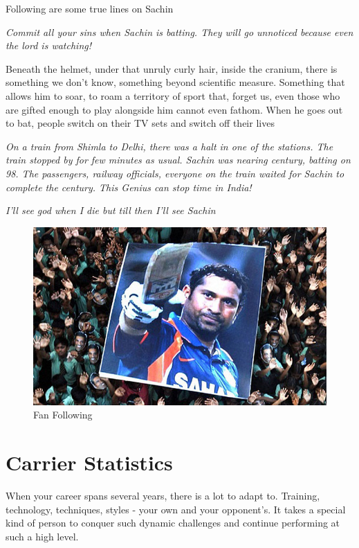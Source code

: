 \documentclass[12pt,twocolumn ]{article}
\begin{document}
\par Following are some true lines on Sachin
\par
\textit{Commit all your sins when Sachin is batting. They will go unnoticed because even the lord is watching!}
\par
Beneath the helmet, under that unruly curly hair, inside the cranium, there is something we don't know, something beyond scientific measure. Something that allows him to soar, to roam a territory of sport that, forget us, even those who are gifted enough to play alongside him cannot even fathom. When he goes out to bat, people switch on their TV sets and switch off their lives
\par
\textit{On a train from Shimla to Delhi, there was a halt in one of the stations. The train stopped by for few minutes as usual. Sachin was nearing century, batting on 98. The passengers, railway officials, everyone on the train waited for Sachin to complete the century. This Genius can stop time in India!}\cite{quora}
\par
\textit{I'll see god when I die but till then I'll see Sachin}
\onecolumn
\begin{figure}[h]
        \begin{center}
                \includegraphics[scale=0.7]{index}
        \end{center}
        \caption{Fan Following}
        \label{fig:shapes}
\end{figure}
\section{Carrier Statistics}
\par When your career spans several years, there is a lot to adapt to. Training, technology, techniques, styles - your own and your opponent's. It takes a special kind of person to conquer such dynamic challenges and continue performing at such a high level.\cite{quora}
\end{document}
